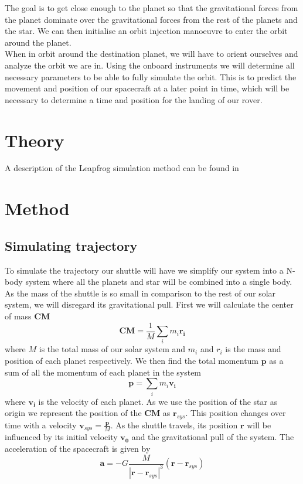 \documentclass[reprint,english,notitlepage]{revtex4-2}
\begin{document}
The goal is to get close enough to the planet so that the gravitational forces from the planet dominate over the gravitational forces from the rest of the planets and the star.
We can then initialise an orbit injection manoeuvre to enter the orbit around the planet.\\

When in orbit around the destination planet, we will have to orient ourselves and analyze the orbit we are in.
Using the onboard instruments we will determine all necessary parameters to be able to fully simulate the orbit.
This is to predict the movement and position of our spacecraft at a later point in time, which will be necessary to determine a time and position for the landing of our rover.



\section{Theory} \label{sec: theory}
A description of the Leapfrog simulation method can be found in %

\section{Method} \label{sec: method}
\subsection{Simulating trajectory} \label{ssec: simulating trajectory}
To simulate the trajectory our shuttle will have we simplify our system into a N-body system where all the planets and star will be combined into a single body.
As the mass of the shuttle is so small in comparison to the rest of our solar system, we will disregard its gravitational pull.
First we will calculate the center of mass $ \mathbf{CM} $
\[
\mathbf{CM} = \frac{1}{M} \sum_{i} m_i \mathbf{r_i}
\]
where $ M $ is the total mass of our solar system and $ m_i $ and $ r_i $ is the mass and position of each planet respectively.
We then find the total momentum $ \mathbf{p} $ as a sum of all the momentum of each planet in the system
\[
\mathbf{p} = \sum_{i} m_i \mathbf{v_i}
\]
where $ \mathbf{v_i} $ is the velocity of each planet. 
As we use the position of the star as origin we represent the position of the $ \mathbf{CM} $ as $ \mathbf{r}_{sys} $.
This position changes over time with a velocity $ \mathbf{v}_{sys} = \frac{\mathbf{p}}{M} $.
As the shuttle travels, its position $ \mathbf{r} $ will be influenced by its initial velocity $ \mathbf{v_0} $ and the gravitational pull of the system.
The acceleration of the spacecraft is given by
\[
\mathbf{a} = -G \frac{M}{\left\vert \mathbf{r} - \mathbf{r}_{sys} \right\vert ^{3}} \left( \mathbf{r} - \mathbf{r}_{sys} \right)
\]
\end{document}
